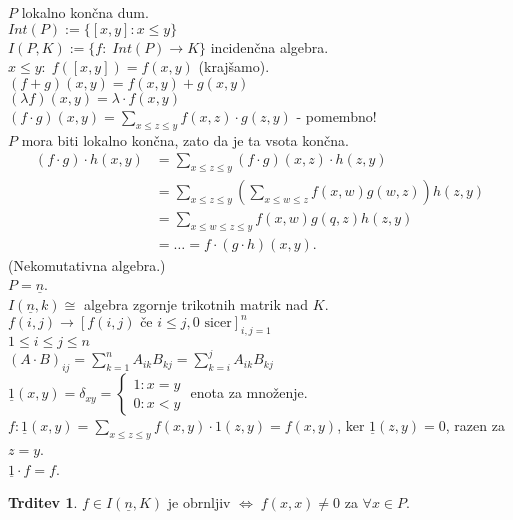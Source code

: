 \documentclass[a4paper, 12pt]{book}
\theoremstyle{definition}
\newtheorem{claim}[counter]{Trditev}
\theoremstyle{remark}
\begin{document}
$P$ lokalno končna dum. \\
$Int(P) := \{[x,y]: x \leq y\}$ \\
$I(P, K) := \{f: \; Int(P) \to K\}$ incidenčna algebra. \\
$x \leq y: \; f([x,y]) = f(x,y)$ (krajšamo). \\
$(f+g)(x,y) = f(x,y) + g(x,y)$ \\
$(\lambda f)(x,y) = \lambda \cdot f(x,y)$ \\
$(f \cdot g)(x,y) = \sum_{x \leq z \leq y} f(x,z) \cdot g(z,y)$ - pomembno! \\
$P$ mora biti lokalno končna, zato da je ta vsota končna.
\begin{align*}
  (f \cdot g) \cdot h(x,y) &= \sum_{x \leq z \leq y} (f \cdot g)(x,z) \cdot h(z,y) \\
  &= \sum_{x \leq z \leq y} \left(\sum_{x \leq w \leq z} f(x,w) g(w,z)\right) h(z,y) \\
  &= \sum_{x \leq w \leq z \leq y} f(x,w) g(q,z) h(z,y) \\
  &= \dots = f \cdot (g \cdot h)(x,y).
\end{align*}
(Nekomutativna algebra.) \\
$P = \underline{n}$. \\
$I(\underline{n}, k) \cong$ algebra zgornje trikotnih matrik nad $K$. \\
$f(i,j) \to \left[f(i,j) \text{ če } i \leq j, 0 \text{ sicer}\right]_{i,j=1}^n$ \\
$1 \leq i \leq j \leq n$ \\
$(A \cdot B)_{ij} = \sum_{k=1}^{n} A_{ik} B_{kj} = \sum_{k=i}^{j} A_{ik} B_{kj}$ \\
$\underline{1}(x,y) = \delta_{xy} = \begin{cases}
  1: x = y \\
  0: x < y
\end{cases}$ enota za množenje. \\
$f: \underline{1}(x,y) = \sum_{x \leq z \leq y} f(x,y) \cdot 1(z,y) = f(x,y)$, ker
$\underline{1}(z,y) = 0$, razen za $z = y$. \\
$\underline{1} \cdot f = f$.
\begin{claim}
  $f \in I(\underline{n}, K)$ je obrnljiv $\iff \; f(x,x) \neq 0$ za $\forall x \in P$.
\end{claim}
\end{document}

